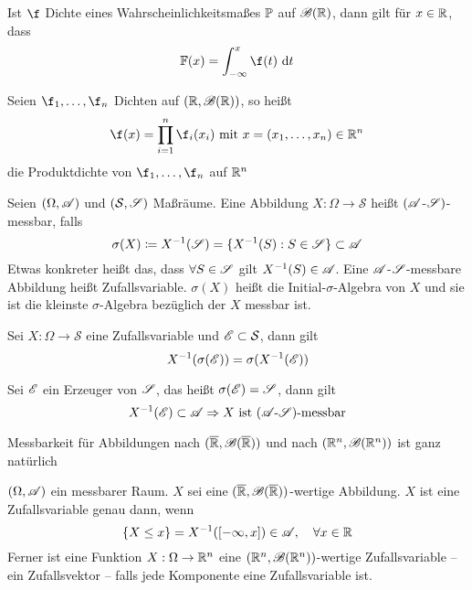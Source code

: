 \documentclass{scrartcl}
\begin{document}
    \begin{lemma}
        Ist $\f$ Dichte eines Wahrscheinlichkeitsmaßes $\P$ auf $\cali{B}(\R)$, dann gilt für $x\in \R$, dass 
        \[
        \F(x) = \int_{-\infty}^x \f(t) \ \D t    
        \]
    \end{lemma}
    \begin{defn}[Produktdichte] Seien $\f_1,\ldots,\f_n$ Dichten auf $(\R,\cali{B}(\R))$, so heißt 
        \[
        \f(x) = \prod_{i=1}^n \f_i(x_i) \text{ mit } x=(x_1,\ldots,x_n)\in \R^n    
        \]
        die Produktdichte von $\f_1,\ldots,\f_n$ auf $\R^n$
    \end{defn}
    \begin{defn}
    Seien $(\Omega,\cali{A})$ und $(\mathcal{S},\cali{S})$ Maßräume. Eine Abbildung $X:\Omega\to\mathcal{S}$ heißt $(\cali{A}$-$\cali{S})$-messbar, falls 
    \[
    \sigma(X) \coloneqq X^{-1}(\cali{S})= \{X^{-1}(S):S\in \cali{S}\} \subset \cali{A}    
    \] Etwas konkreter heißt das, dass $\forall S\in \cali{S}$ gilt $X^{-1}(S)\in \cali{A}$. Eine $\cali{A}$-$\cali{S}$-messbare Abbildung heißt Zufallsvariable. $\sigma(X)$ heißt die Initial-$\sigma$-Algebra von $X$ und sie ist die kleinste $\sigma$-Algebra bezüglich der $X$ messbar ist.
    \end{defn}
    \begin{lemma}
        Sei $X:\Omega \to \mathcal{S}$ eine Zufallsvariable und $\cali{E}\subset \mathcal{S}$, dann gilt 
        \[
        X^{-1}(\sigma(\cali{E})) = \sigma(X^{-1}(\cali{E}))    
        \]
    \end{lemma}
    \begin{lemma}
        Sei $\cali{E}$ ein Erzeuger von $\cali{S}$, das heißt $\sigma(\cali{E}) = \cali{S}$, dann gilt 
        \[
        X^{-1}(\cali{E})\subset \cali{A} \Rightarrow X \text{ ist } (\cali{A}\text{-}\cali{S})\text{-messbar}    
        \]
    \end{lemma}
    Messbarkeit für Abbildungen nach $(\overline{\R}, \cali{B}(\overline{\R}))$ und nach $(\R^n,\cali{B}(\R^n))$ ist ganz natürlich
    \begin{lemma}
        $(\Omega,\cali{A})$ ein messbarer Raum. $X$ sei eine $(\overline{\R},\cali{B}(\overline{\R}))$-wertige Abbildung. $X$ ist eine Zufallsvariable genau dann, wenn 
        \[
            \{X\le x\} = X^{-1}([-\infty,x]) \in \cali{A}, \quad \forall x\in \R
        \] 
        Ferner ist eine Funktion $X:\Omega\to \R^n$ eine $(\R^n,\cali{B}(\R^n))$-wertige Zufallsvariable -- ein Zufallsvektor -- falls jede Komponente eine Zufallsvariable ist.
    \end{lemma}
\end{document}
